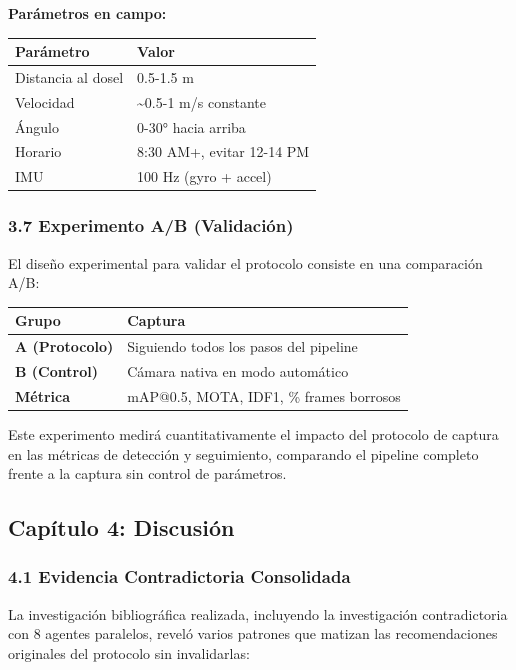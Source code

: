 \textbf{Parámetros en campo:}



\begin{tabular}{ll}
\hline
Parámetro & Valor \\
\hline
Distancia al dosel & 0.5-1.5 m \\
Velocidad & \textasciitilde{}0.5-1 m/s constante \\
Ángulo & 0-30° hacia arriba \\
Horario & 8:30 AM+, evitar 12-14 PM \\
IMU & 100 Hz (gyro + accel) \\
\hline
\end{tabular}


\subsubsection{3.7 Experimento A/B (Validación)}


El diseño experimental para validar el protocolo consiste en una comparación A/B:



\begin{tabular}{ll}
\hline
Grupo & Captura \\
\hline
\textbf{A (Protocolo)} & Siguiendo todos los pasos del pipeline \\
\textbf{B (Control)} & Cámara nativa en modo automático \\
\textbf{Métrica} & mAP@0.5, MOTA, IDF1, \% frames borrosos \\
\hline
\end{tabular}


Este experimento medirá cuantitativamente el impacto del protocolo de captura en las métricas de detección y seguimiento, comparando el pipeline completo frente a la captura sin control de parámetros.


\hline


\subsection{Capítulo 4: Discusión}


\subsubsection{4.1 Evidencia Contradictoria Consolidada}


La investigación bibliográfica realizada, incluyendo la investigación contradictoria con 8 agentes paralelos, reveló varios patrones que matizan las recomendaciones originales del protocolo sin invalidarlas:


